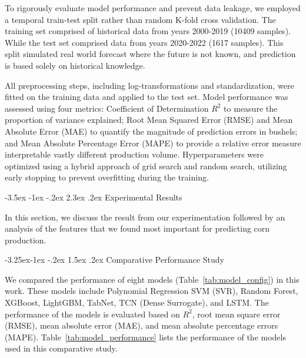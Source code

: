 \documentclass[10pt,twocolumn]{article}
\makeatletter
\newcommand{\reftab}[1]{Table~\ref{#1}}
\renewcommand\section{\@startsection{section}{1}{\z@}%
  {-3.5ex \@plus -1ex \@minus -.2ex}%
  {2.3ex \@plus.2ex}%
  {\normalfont\large\bfseries}}
\renewcommand\subsection{\@startsection{subsection}{2}{\z@}%
  {-3.25ex\@plus -1ex \@minus -.2ex}%
  {1.5ex \@plus .2ex}%
  {\normalfont\normalsize\bfseries}}
\makeatother
\begin{document}
To rigorously evaluate model performance and prevent data leakage, we employed a temporal train-test split rather than random K-fold cross validation.
The training set comprised of historical data from years 2000-2019 (\num{10409} samples).
While the test set comprised data from years 2020-2022 (\num{1617} samples).
This split simulated real world forecast where the future is not known, and prediction is based solely on historical knowledge.

All preprocessing steps, including log-transformations and standardization, were fitted on the training data and applied to the test set.
Model performance was assessed using four metrics: Coefficient of Determination \(R^2\) to measure the proportion of variance explained; Root Mean Squared Error (RMSE) and Mean Absolute Error (MAE) to quantify the magnitude of prediction errors in bushels; and Mean Absolute Percentage Error (MAPE) to provide a relative error measure interpretable vastly different production volume.
Hyperparameters were optimized using a hybrid approach of grid search and random search, utilizing early stopping to prevent overfitting during the training.

\section{Experimental Results}

In this section, we discuss the result from our experimentation followed by an analysis of the features that we found most important for predicting corn production.

\subsection{Comparative Performance Study}

We compared the performance of eight models (\reftab{tab:model_config}) in this work.
These models include Polynomial Regression SVM (SVR), Random Forest, XGBoost, LightGBM, TabNet, TCN (Dense Surrogate), and LSTM.
The performance of the models is evaluated based on \(R^2\), root mean square error (RMSE), mean absolute error (MAE), and mean absolute percentage errors (MAPE).
\reftab{tab:model_performance} lists the performance of the models used in this comparative study.
\end{document}
